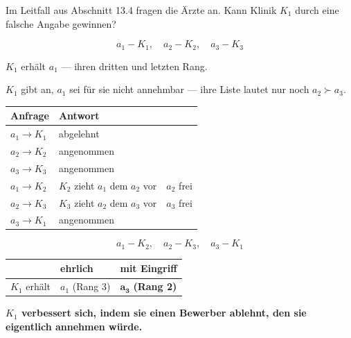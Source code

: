 \begin{aufgabe}
Im Leitfall aus Abschnitt 13.4 fragen die Ärzte an. Kann Klinik $K_1$ durch eine falsche Angabe gewinnen?

\loesung
{}
\[ a_1\!-\!K_1, \quad a_2\!-\!K_2, \quad a_3\!-\!K_3 \]

$K_1$ erhält $a_1$ --- ihren dritten und letzten Rang.

$K_1$ gibt an, $a_1$ sei für sie nicht annehmbar --- ihre Liste lautet nur noch $a_2 \succ a_3$.

\begin{center}
{\small
\renewcommand{\arraystretch}{1.48}
\begin{tabular}{@{}P{2.0cm}P{2.8cm}P{2.4cm}@{}}
\toprule
\textbf{Anfrage} & \textbf{Antwort} & \\
\midrule
$a_1 \to K_1$ & \textcolor{akzent}{abgelehnt} & \\
$a_2 \to K_2$ & angenommen & \\
$a_3 \to K_3$ & angenommen & \\
$a_1 \to K_2$ & $K_2$ zieht $a_1$ dem $a_2$ vor & $a_2$ frei\\
$a_2 \to K_3$ & $K_3$ zieht $a_2$ dem $a_3$ vor & $a_3$ frei\\
$a_3 \to K_1$ & angenommen & \\
\bottomrule
\end{tabular}}
\end{center}

\[ a_1\!-\!K_2, \quad a_2\!-\!K_3, \quad a_3\!-\!K_1 \]

\begin{center}
{\small
\renewcommand{\arraystretch}{1.5}
\begin{tabular}{@{}P{2.2cm}P{2.4cm}P{2.8cm}@{}}
\toprule
& \textbf{ehrlich} & \textbf{mit Eingriff}\\
\midrule
$K_1$ erhält & $a_1$ (Rang $3$) & $\mathbf{a_3}$ \textbf{(Rang 2)}\\
\bottomrule
\end{tabular}}
\end{center}

\begin{center}
\begin{minipage}{0.9\textwidth}
\textbf{$K_1$ verbessert sich, indem sie einen Bewerber ablehnt, den sie eigentlich annehmen würde.}
\end{minipage}
\end{center}


\end{aufgabe}
